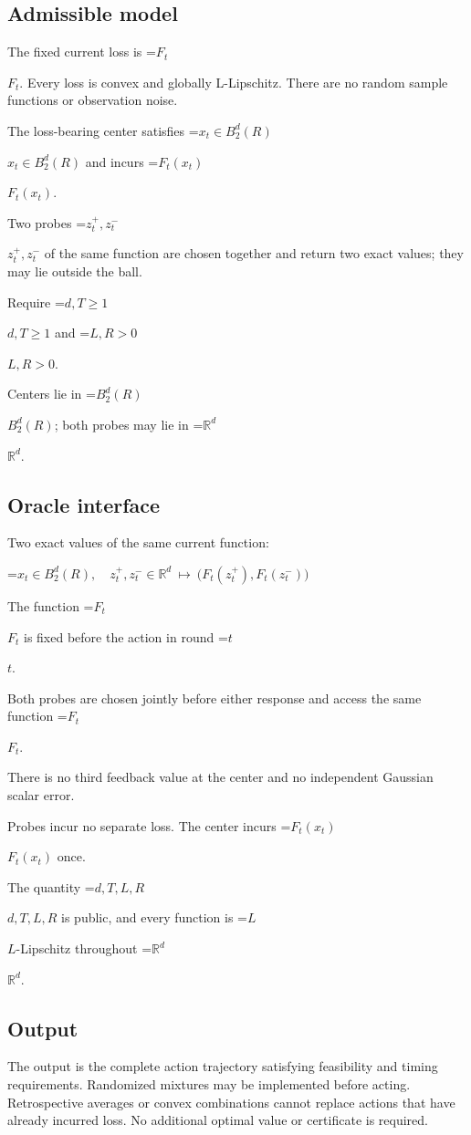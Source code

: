 \documentclass[10pt,a4paper]{article}
\newcommand{\AtlasMath}[1]{\par\begingroup\centering\setbox0=\hbox{$\displaystyle #1$}\ifdim\wd0>1.4\linewidth\typeout{ATLAS WIDE FORMULA: \the\wd0}\fi\ifdim\wd0>\linewidth\resizebox{\linewidth}{!}{\box0}\else\box0\fi\par\endgroup}
\newcommand{\AtlasInlineMath}[1]{\begingroup\setbox0=\hbox{$#1$}\ifdim\wd0>.4\linewidth\endgroup\AtlasMath{#1}\else\endgroup$#1$\fi}
\begin{document}
\subsection{Admissible model}
The fixed current loss is \AtlasInlineMath{F_t}. Every loss is convex and globally L-Lipschitz. There are no random sample functions or observation noise.

The loss-bearing center satisfies \AtlasInlineMath{x_t\in B_2^d(R)} and incurs \AtlasInlineMath{F_t(x_t)}.

Two probes \AtlasInlineMath{z_t^+,z_t^-} of the same function are chosen together and return two exact values; they may lie outside the ball.

Require \AtlasInlineMath{d,T\ge1} and \AtlasInlineMath{L,R>0}.

Centers lie in \AtlasInlineMath{B_2^d(R)}; both probes may lie in \AtlasInlineMath{\mathbb R^d}.

\subsection{Oracle interface}
Two exact values of the same current function:


\AtlasMath{x_t\in B_2^d(R),\quad z_t^+,z_t^-\in\mathbb{R}^d\ \longmapsto\ \big(F_t(z_t^+),F_t(z_t^-)\big)}


The function \AtlasInlineMath{F_t} is fixed before the action in round \AtlasInlineMath{t}.

Both probes are chosen jointly before either response and access the same function \AtlasInlineMath{F_t}.

There is no third feedback value at the center and no independent Gaussian scalar error.

Probes incur no separate loss. The center incurs \AtlasInlineMath{F_t(x_t)} once.

The quantity \AtlasInlineMath{d,T,L,R} is public, and every function is \AtlasInlineMath{L}-Lipschitz throughout \AtlasInlineMath{\mathbb{R}^d}.

\subsection{Output}
The output is the complete action trajectory satisfying feasibility and timing requirements. Randomized mixtures may be implemented before acting. Retrospective averages or convex combinations cannot replace actions that have already incurred loss. No additional optimal value or certificate is required.
\end{document}
